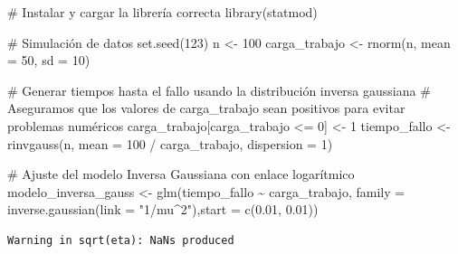 \documentclass[
  letterpaper,
  DIV=11,
  numbers=noendperiod]{scrreprt}
\newenvironment{Shaded}{\begin{snugshade}}{\end{snugshade}}
\newcommand{\AttributeTok}[1]{\textcolor[rgb]{0.40,0.45,0.13}{#1}}
\newcommand{\CommentTok}[1]{\textcolor[rgb]{0.37,0.37,0.37}{#1}}
\newcommand{\DecValTok}[1]{\textcolor[rgb]{0.68,0.00,0.00}{#1}}
\newcommand{\FloatTok}[1]{\textcolor[rgb]{0.68,0.00,0.00}{#1}}
\newcommand{\FunctionTok}[1]{\textcolor[rgb]{0.28,0.35,0.67}{#1}}
\newcommand{\NormalTok}[1]{\textcolor[rgb]{0.00,0.23,0.31}{#1}}
\newcommand{\OtherTok}[1]{\textcolor[rgb]{0.00,0.23,0.31}{#1}}
\newcommand{\SpecialCharTok}[1]{\textcolor[rgb]{0.37,0.37,0.37}{#1}}
\newcommand{\StringTok}[1]{\textcolor[rgb]{0.13,0.47,0.30}{#1}}
\begin{document}
\begin{tcolorbox}[enhanced jigsaw, leftrule=.75mm, breakable, colbacktitle=quarto-callout-tip-color!10!white, bottomrule=.15mm, colframe=quarto-callout-tip-color-frame, toprule=.15mm, colback=white, coltitle=black, bottomtitle=1mm, left=2mm, title=\textcolor{quarto-callout-tip-color}{\faLightbulb}\hspace{0.5em}{Ejemplo}, opacityback=0, arc=.35mm, opacitybacktitle=0.6, toptitle=1mm, titlerule=0mm, rightrule=.15mm]

\begin{Shaded}
\begin{Highlighting}[]
\CommentTok{\# Instalar y cargar la librería correcta}
\FunctionTok{library}\NormalTok{(statmod)}

\CommentTok{\# Simulación de datos}
\FunctionTok{set.seed}\NormalTok{(}\DecValTok{123}\NormalTok{)}
\NormalTok{n }\OtherTok{\textless{}{-}} \DecValTok{100}
\NormalTok{carga\_trabajo }\OtherTok{\textless{}{-}} \FunctionTok{rnorm}\NormalTok{(n, }\AttributeTok{mean =} \DecValTok{50}\NormalTok{, }\AttributeTok{sd =} \DecValTok{10}\NormalTok{)}

\CommentTok{\# Generar tiempos hasta el fallo usando la distribución inversa gaussiana}
\CommentTok{\# Aseguramos que los valores de carga\_trabajo sean positivos para evitar problemas numéricos}
\NormalTok{carga\_trabajo[carga\_trabajo }\SpecialCharTok{\textless{}=} \DecValTok{0}\NormalTok{] }\OtherTok{\textless{}{-}} \DecValTok{1}
\NormalTok{tiempo\_fallo }\OtherTok{\textless{}{-}} \FunctionTok{rinvgauss}\NormalTok{(n, }\AttributeTok{mean =} \DecValTok{100} \SpecialCharTok{/}\NormalTok{ carga\_trabajo, }\AttributeTok{dispersion =} \DecValTok{1}\NormalTok{)}

\CommentTok{\# Ajuste del modelo Inversa Gaussiana con enlace logarítmico}
\NormalTok{modelo\_inversa\_gauss }\OtherTok{\textless{}{-}} \FunctionTok{glm}\NormalTok{(tiempo\_fallo }\SpecialCharTok{\textasciitilde{}}\NormalTok{ carga\_trabajo, }\AttributeTok{family =} \FunctionTok{inverse.gaussian}\NormalTok{(}\AttributeTok{link =} \StringTok{"1/mu\^{}2"}\NormalTok{),}\AttributeTok{start =} \FunctionTok{c}\NormalTok{(}\FloatTok{0.01}\NormalTok{, }\FloatTok{0.01}\NormalTok{))}
\end{Highlighting}
\end{Shaded}

\begin{verbatim}
Warning in sqrt(eta): NaNs produced
\end{verbatim}


\end{tcolorbox}
\end{document}
